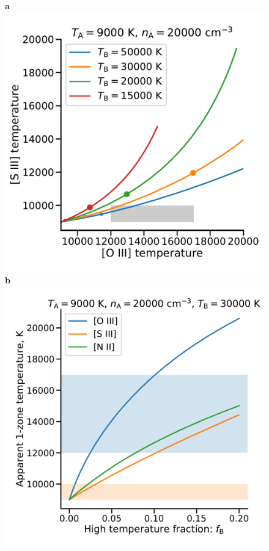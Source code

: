 \documentclass[twocolumn]{aastex63}
\begin{document}
\begin{figure}
  \textbf{\Large a}\\
  \includegraphics[width=\linewidth]{two-temp-Toiii-Tsiii}\\
  \textbf{\Large b}\\
  \includegraphics[width=\linewidth]{two-temp-TB-30000}

\end{figure}
\end{document}
